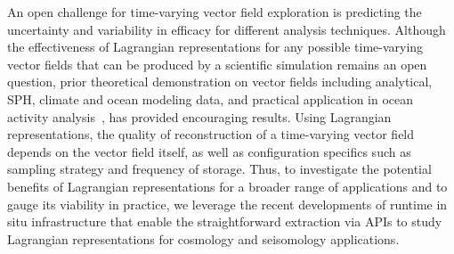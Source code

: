 An open challenge for time-varying vector field exploration is predicting the uncertainty and variability in efficacy for different analysis techniques.
%
Although the effectiveness of Lagrangian representations for any possible time-varying vector fields that can be produced by a scientific simulation remains an open question, prior theoretical demonstration on vector fields including analytical, SPH, climate and ocean modeling data, and practical application in ocean activity analysis~\cite{envirvis.20171099}\cite{siegfried2019tropical}, has provided encouraging results.
%
%
Using Lagrangian representations, the quality of reconstruction of a time-varying vector field depends on the vector field itself, as well as configuration specifics such as sampling strategy and frequency of storage.
%
Thus, to investigate the potential benefits of Lagrangian representations for a broader range of applications and to gauge its viability in practice, we leverage the recent developments of runtime in situ infrastructure that enable the straightforward extraction via APIs to study Lagrangian representations for cosmology and seisomology applications.   
%
%
%
%


